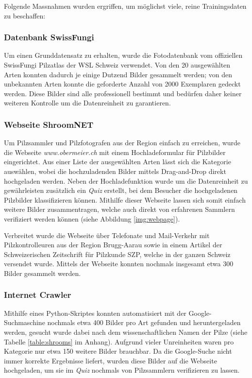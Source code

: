 Folgende Massnahmen wurden ergriffen, um möglichst viele, reine Trainingsdaten zu beschaffen:

\subsubsection{Datenbank SwissFungi}
Um einen Grunddatensatz zu erhalten, wurde die Fotodatenbank vom offiziellen SwissFungi Pilzatlas der WSL Schweiz verwendet\cite{wsl}. Von den 20 ausgewählten Arten konnten dadurch je einige Dutzend Bilder gesammelt werden; von den unbekannten Arten konnte die geforderte Anzahl von 2000 Exemplaren gedeckt werden. Diese Bilder sind alle professionell bestimmt und bedürfen daher keiner weiteren Kontrolle um die Datenreinheit zu garantieren. 

\subsubsection{Webseite ShroomNET}
Um Pilzsammler und Pilzfotografen aus der Region einfach zu erreichen, wurde die Webseite \textit{www.obermeier.ch} mit einem Hochladeformular für Pilzbilder eingerichtet. Aus einer Liste der ausgewählten Arten lässt sich die Kategorie auswählen, wobei die hochzuladenden Bilder mittels Drag-and-Drop direkt hochgeladen werden. Neben der Hochladefunktion wurde um die Datenreinheit zu gewährleisten zusätzlich ein \textit{Quiz} erstellt, bei dem Besucher die hochgeladenen Pilzbilder klassifizieren können. Mithilfe dieser Webseite lassen sich somit einfach weitere Bilder zusammentragen, welche auch direkt von erfahrenen Sammlern verifiziert werden können (siehe Abbildung \ref{img:webpage}).

Verbreitet wurde die Webseite über Telefonate und Mail-Verkehr mit Pilzkontrolleuren aus der Region Brugg-Aarau sowie in einem Artikel der Schweizerischen Zeitschrift für Pilzkunde SZP\cite{szp}, welche in der ganzen Schweiz versendet wurde. Mittels der Webseite konnten nochmals insgesamt etwa 300 Bilder gesammelt werden.

\subsubsection{Internet Crawler}
Mithilfe eines Python-Skriptes\cite{crawler} konnten automatisiert mit der Google-Suchmaschine nochmals etwa 400 Bilder pro Art gefunden und heruntergeladen werden, gesucht wurde dabei nach dem wissenschaftlichen Namen der Pilze (siehe Tabelle \ref{table:shrooms} im Anhang). Aufgrund vieler Unreinheiten waren pro Kategorie nur etwa 150 weitere Bilder brauchbar. Da die Google-Suche nicht immer korrekte Ergebnisse liefert, wurden diese Bilder auf die Webseite hochgeladen, um sie im \textit{Quiz} nochmals von Pilzsammlern verifizieren zu lassen. 

